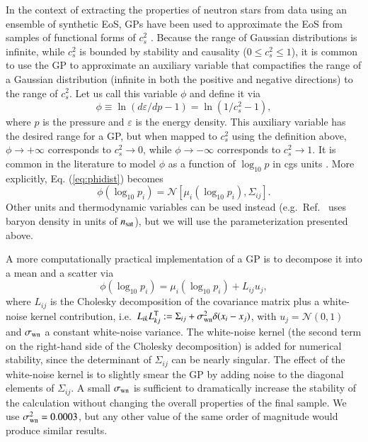 \documentclass[aps,prd,nofootinbib,tightenlines,notitlepage,floatfix,superscriptaddress,showkeys,twocolumn]{revtex4-1}
\begin{document}
In the context of extracting the properties of neutron stars from data using an ensemble of synthetic EoS, GPs have been used to approximate the EoS from samples of functional forms of $c_s^2$ \cite{Essick:2019ldf,Komoltsev:2021jzg,Landry:2020vaw,Landry:2018prl,Essick:2021kjb,Essick:2020flb,Legred:2021hdx}. Because the range of Gaussian distributions is infinite,  
while $c_s^2$ is bounded by stability and causality ($0 \leq c_s^2 \leq 1$), it is common to use the GP to approximate an auxiliary variable that compactifies the range of a Gaussian distribution (infinite in both the positive and negative directions) to the range of $c_s^2$. Let us call this variable $\phi$ \cite{Lindblom:2010bb,Landry:2018prl} and define it via
\begin{equation}\label{eq:phitocs2}
\phi \equiv \ln(d\varepsilon/dp - 1) = \ln(1/c_s^2 - 1),
\end{equation}
where $p$ is the pressure and $\varepsilon$ is the energy density. 
This auxiliary variable has the desired range for a GP, but when mapped to $c_s^2$ using the definition above, $\phi \rightarrow +\infty$ corresponds to $c_s^2 \to 0$, while $\phi \rightarrow -\infty$ corresponds to $c_s^2 \to 1$. 
It is common in the literature to model $\phi$ as a function of $\log_{10} p$ in cgs units \cite{Miller:2021qha,Essick:2019ldf,Landry:2020vaw,Landry:2018prl,Essick:2021kjb,Essick:2020flb,Legred:2021hdx}. More explicitly, Eq. (\ref{eq:phidist}) becomes
\begin{equation}\label{eq: GPform}
    \phi(\log_{10} p_i) = \mathcal{N}\left[\mu_i(\log_{10} p_i), \Sigma_{ij}\right].
\end{equation}
Other units and thermodynamic variables can be used instead (e.g.~Ref.~\cite{Komoltsev:2021jzg} uses baryon density in units of $n_{\rm sat}$), but we will use the parameterization presented above. 

A more computationally practical implementation of a GP is to decompose it into a mean and a scatter via 
\begin{equation}\label{eq:Cholesky}
    \phi(\log_{10} p_i) = \mu_i(\log_{10} p_i) + L_{ij} u_j,
\end{equation}
where $L_{ij}$ is the Cholesky decomposition of the covariance matrix plus a white-noise kernel contribution, i.e.~$ L_{ik}L_{kj}^{\rm T} := \Sigma_{ij} + \sigma_{\rm wn}^2\delta(x_i -x_j)$, with $u_j = \mathcal{N}(0,1)$ and $\sigma_{\rm wn}$ a constant white-noise variance. The white-noise kernel (the second term on the right-hand side of the Cholesky decomposition) is added for numerical stability, since the determinant of $\Sigma_{ij}$ can be nearly singular. The effect of the white-noise kernel is to slightly smear the GP by adding noise to the diagonal elements of $\Sigma_{ij}$. A small $\sigma_{\rm wn}$ is sufficient to dramatically increase the stability of the calculation without changing the overall properties of the final sample. We use $\sigma^2_{\rm wn} = 0.0003$, but any other value of the same order of magnitude would produce similar results.
\end{document}
